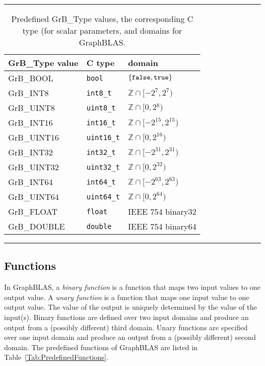 \begin{table}
\hrule
\begin{center}
\caption{Predefined {\sf GrB\_Type} values, the corresponding C type (for scalar
parameters, and domains for GraphBLAS. 
        }
\label{Tab:PredefinedTypes}
\begin{tabular}{l|l|l}
{\sf GrB\_Type value} & C type            & domain \\
\hline
{\sf GrB\_BOOL}       & {\tt bool}        & $\{ {\tt false}, {\tt true} \}$  \\
{\sf GrB\_INT8}       & {\tt int8\_t}     & $\mathbb{Z} \cap [-2^{7},2^{7})$  \\
{\sf GrB\_UINT8}     & {\tt uint8\_t}     & $\mathbb{Z} \cap [0,2{^8})$  \\
{\sf GrB\_INT16}     & {\tt int16\_t}     & $\mathbb{Z} \cap [-2^{15},2^{15})$ \\
{\sf GrB\_UINT16}    & {\tt uint16\_t}    & $\mathbb{Z} \cap [0,2^{16})$ \\
{\sf GrB\_INT32}     & {\tt int32\_t}     & $\mathbb{Z} \cap [-2^{31},2^{31})$ \\
{\sf GrB\_UINT32}    & {\tt uint32\_t}    & $\mathbb{Z} \cap [0,2^{32})$ \\
{\sf GrB\_INT64}     & {\tt int64\_t}     & $\mathbb{Z} \cap [-2^{63},2^{63})$ \\
{\sf GrB\_UINT64}    & {\tt uint64\_t}    & $\mathbb{Z} \cap [0,2^{64})$ \\
{\sf GrB\_FLOAT}     & {\tt float}        & IEEE 754 {\sf binary32}  \\
{\sf GrB\_DOUBLE}    & {\tt double}       & IEEE 754 {\sf binary64}  \\
\end{tabular}
\end{center}
\hrule
\end{table}

\subsection{Functions}

In GraphBLAS, a \emph{binary function} is a function that maps two input
values to one output value. A \emph{unary function} is a function that 
maps one input value to one output value. The value of the output is uniquely
determined by the value of the input(s).  Binary functions are defined over 
two input domains and produce an output from a (possibly different) third 
domain. Unary functions are specified over one input domain and produce an 
output from a (possibly different) second domain.  The predefined functions 
of GraphBLAS are listed in Table~\ref{Tab:PredefinedFunctions}.

